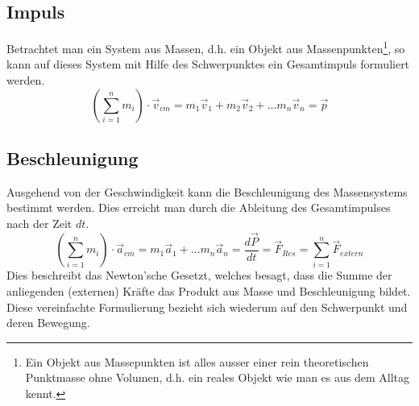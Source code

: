 \subsection{Impuls}
Betrachtet man ein System aus Massen, d.h. ein Objekt aus 
Massenpunkten\footnote{Ein Objekt aus Massepunkten ist alles ausser 
einer rein theoretischen Punktmasse ohne Volumen, d.h. ein reales Objekt
wie man es aus dem Alltag kennt.}, so kann
auf dieses System mit Hilfe des Schwerpunktes ein Gesamtimpuls
formuliert werden.
\[ \boxed{
	\left( \sum_{i=1}^n m_i \right) \cdot \vec{v}_{cm} 
		= m_1 \vec{v}_1 + m_2 \vec{v}_2 + \dots m_n \vec{v}_n
		=\vec{p} }
\]

\subsection{Beschleunigung}
Ausgehend von der Geschwindigkeit kann die Beschleunigung des 
Massensystems bestimmt werden. Dies erreicht man durch die 
Ableitung des Gesamtimpulses nach der Zeit $dt$.
\[ \boxed{
	\left( \sum_{i=1}^n m_i \right) \cdot \vec{a}_{cm} 
		= m_1 \vec{a}_1 + \dots m_n \vec{a}_n
		= \frac{d \vec{P}}{dt} 
		= \vec{F}_{Res}
		= \sum_{i=1}^n \vec{F}_{extern} }
\]
Dies beschreibt das Newton'sche Gesetzt, welches besagt, dass die 
Summe der anliegenden (externen) Kräfte das Produkt aus Masse und
Beschleunigung bildet. Diese vereinfachte Formulierung bezieht sich
wiederum auf den Schwerpunkt und deren Bewegung.


